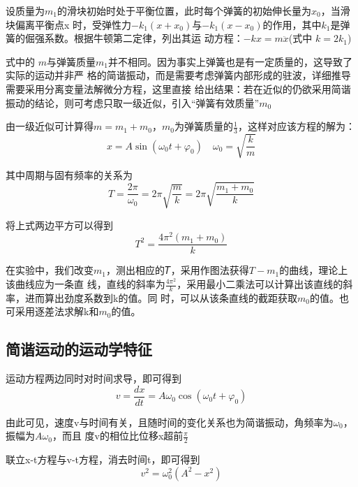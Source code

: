 \documentclass[11pt,a4paper]{article}
\begin{document}
    设质量为$m_1$的滑块初始时处于平衡位置，此时每个弹簧的初始伸长量为$x_0$，当滑块偏离平衡点x
    时，受弹性力$-k_1(x+x_0)$与$-k_1(x-x_0)$的作用，其中$k_1$是弹簧的倔强系数。根据牛顿第二定律，列出其运
    动方程：$ - kx = m\ddot x$(式中 $k = 2 k_1$)

    式中的 $𝑚$与弹簧质量$m_1$并不相同。因为事实上弹簧也是有一定质量的，这导致了实际的运动并非严
    格的简谐振动，而是需要考虑弹簧内部形成的驻波，详细推导需要采用分离变量法解微分方程，这里直接
    给出结果：若在近似的仍欲采用简谐振动的结论，则可考虑只取一级近似，引入“弹簧有效质量”$m_0$

    由一级近似可计算得$m = m_1 + m_0$，$m_0$为弹簧质量的$\frac{1}{3}$，这样对应该方程的解为：
    \begin{equation}
        x = A\sin ({\omega _0}t + {\varphi _0})\quad {\omega _0} = \sqrt {\frac{k}{m}} 
    \end{equation}

    其中周期与固有频率的关系为
    \begin{equation}
        T = \frac{{2\pi }}{{{\omega _0}}} = 2\pi \sqrt {\frac{m}{k}}  = 2\pi \sqrt {\frac{{{m_1} + {m_0}}}{k}} 
    \end{equation}

    将上式两边平方可以得到
    \begin{equation}
        {T^2} = \frac{{4{\pi ^2}\left( {{m_1} + {m_0}} \right)}}{k}
    \end{equation}

    在实验中，我们改变$m_1$，测出相应的𝑇，采用作图法获得$T-m_1$的曲线，理论上该曲线应为一条直
    线，直线的斜率为$\frac{4 \pi^2}{k}$，采用最小二乘法可以计算出该直线的斜率，进而算出劲度系数到k的值。同
    时，可以从该条直线的截距获取$m_0$的值。也可采用逐差法求解k和$m_0$的值。

    \subsection{简谐运动的运动学特征}
    运动方程两边同时对时间求导，即可得到
    \begin{equation}
        v = \frac{{dx}}{{dt}} = A{\omega _0}\cos \left( {{\omega _0}t + {\varphi _0}} \right)
    \end{equation}

    由此可见，速度v与时间有关，且随时间的变化关系也为简谐振动，角频率为$\omega_0$，振幅为$A \omega_0$，而且
    度v的相位比位移x超前$\frac{\pi}{2}$

    联立x-t方程与v-t方程，消去时间t，即可得到
    \begin{equation}
        {v^2} = \omega _0^2\left( {{A^2} - {x^2}} \right)
    \end{equation}
\end{document}
